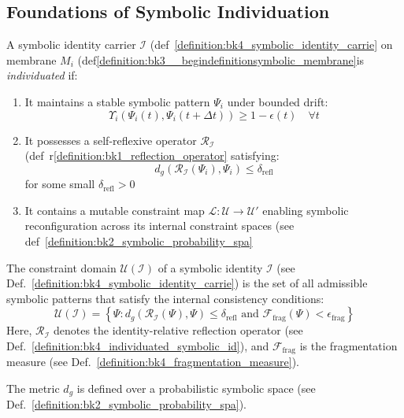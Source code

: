 \subsection{Foundations of Symbolic Individuation} \label{subsec:bk4_foundations_symbolic_individuation}
\begin{definition} \label{definition:bk4_individuated_symbolic_id}
A symbolic identity carrier $\mathcal{I}$ (def~\ref{definition:bk4_symbolic_identity_carrie} on membrane $M_i$ (def\ref{definition:bk3__begindefinitionsymbolic_membrane}is \textit{individuated} if:
\begin{enumerate}
    \item It maintains a stable symbolic pattern $\Psi_i$ under bounded drift:
    \begin{equation}
        \Upsilon_i(\Psi_i(t), \Psi_i(t+\Delta t)) \geq 1 - \epsilon(t) \quad \forall t
    \end{equation}
    \item It possesses a self-reflexive operator $\mathcal{R}_{\mathcal{I}}$ (def~r\ref{definition:bk1_reflection_operator} satisfying:
    \begin{equation}
        d_g(\mathcal{R}_{\mathcal{I}}(\Psi_i), \Psi_i) \leq \delta_{\text{refl}}
    \end{equation}
    for some small $\delta_{\text{refl}} > 0$
    \item It contains a mutable constraint map $\mathcal{L}: \mathcal{U} \to \mathcal{U}'$ enabling symbolic reconfiguration across its internal constraint spaces (see def~\ref{definition:bk2_symbolic_probability_spa}
\end{enumerate}
\end{definition}
\begin{definition} 
\label{definition:bk4_constraint_domain}
The constraint domain $\mathcal{U}(\mathcal{I})$ of a symbolic identity $\mathcal{I}$ (see Def.~\ref{definition:bk4_symbolic_identity_carrie}) is the set of all admissible symbolic patterns that satisfy the internal consistency conditions:
\begin{equation}
    \mathcal{U}(\mathcal{I}) = \left\{\Psi : d_g(\mathcal{R}_{\mathcal{I}}(\Psi), \Psi) \leq \delta_{\text{refl}} \text{ and } \mathcal{F}_{\text{frag}}(\Psi) < \epsilon_{\text{frag}} \right\}
\end{equation}
Here, $\mathcal{R}_{\mathcal{I}}$ denotes the identity-relative reflection operator (see Def.~\ref{definition:bk4_individuated_symbolic_id}), and $\mathcal{F}_{\text{frag}}$ is the fragmentation measure (see Def.~\ref{definition:bk4_fragmentation_measure}). 

The metric $d_g$ is defined over a probabilistic symbolic space (see Def.~\ref{definition:bk2_symbolic_probability_spa}).
\end{definition}

